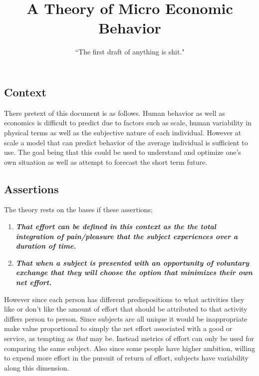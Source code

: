 \documentclass[]{article}
\title{A Theory of Micro Economic Behavior}
\author{``The first draft of anything is shit."}
\begin{document}
\maketitle
\newpage




\subsection{Context}

There pretext of this document is as  follows. Human behavior as well as economics is difficult to predict due to factors such as scale, human variability in physical terms as well as the subjective nature of each individual. However at scale a model that can predict behavior of the average individual is sufficient to use. The goal being that this could be used to understand and optimize one's own situation as well as attempt to forecast the short term future.

\subsection{Assertions}

The theory rests on the bases if these assertions;
\begin{enumerate}
  \item \textbf{\textit{That effort can be defined in this context as the the total integration of pain/pleasure that the subject experiences over a duration of time.}}
  \item \textbf{\textit{That when a subject is presented with an opportunity of voluntary exchange that they will choose the option that minimizes their own net effort.}}
\end{enumerate}

However since each person has different predispositions to what activities they like or don't like the amount of effort that should be attributed to that activity differs person to person. Since subjects are all unique it would be inappropriate make value proportional to simply the net effort associated with a good or service, as tempting as \textit{that} may be. Instead metrics of effort can only be used for comparing the same subject. Also since some people have higher ambition, willing to expend more effort in the pursuit of return of effort, subjects have variability along this dimension.
\end{document}
